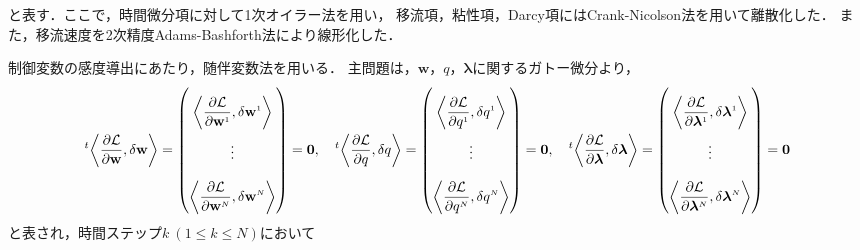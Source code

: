 と表す．ここで，時間微分項に対して1次オイラー法を用い，
移流項，粘性項，Darcy項にはCrank-Nicolson法を用いて離散化した．
また，移流速度を2次精度Adams-Bashforth法により線形化した．\par
制御変数の感度導出にあたり，随伴変数法を用いる．
主問題は，$\mathbf{w}$，$q$，$\boldsymbol{\lambda}$に関するガトー微分より，
\begin{equation}
    \everymath{\displaystyle}
    \setlength{\arraycolsep}{0.5pt}
    \renewcommand{\arraystretch}{2.5}
    \label{eq:main_problem}
    {}^{t}\!\left\langle\frac{\partial \mathcal{L}}{\partial \mathbf{w}}, \delta {\mathbf{w}}\right\rangle
    = \begin{pmatrix}
        \left\langle\frac{\partial \mathcal{L}}{\partial \mathbf{w}^{\scriptscriptstyle 1}}, \delta {\mathbf{w}}^{\scriptscriptstyle 1}\right\rangle \\
        \vdots \\
        \left\langle\frac{\partial \mathcal{L}}{\partial \mathbf{w}^{\scriptscriptstyle N}}, \delta {\mathbf{w}}^{\scriptscriptstyle N}\right\rangle 
    \end{pmatrix}
    =\mathbf{0}
    ,\quad
    {}^{t}\!\left\langle\frac{\partial \mathcal{L}}{\partial q}, \delta {q}\right\rangle
    = \begin{pmatrix}
        \left\langle\frac{\partial \mathcal{L}}{\partial q^{\scriptscriptstyle 1}}, \delta {q}^{\scriptscriptstyle 1}\right\rangle \\
        \vdots \\
        \left\langle\frac{\partial \mathcal{L}}{\partial q^{\scriptscriptstyle N}}, \delta {q}^{\scriptscriptstyle N}\right\rangle 
    \end{pmatrix}
    =\mathbf{0}
    ,\quad
    {}^{t}\!\left\langle\frac{\partial \mathcal{L}}{\partial \boldsymbol{\lambda}}, \delta \boldsymbol{\lambda}\right\rangle
    = \begin{pmatrix}
        \left\langle\frac{\partial \mathcal{L}}{\partial \boldsymbol{\lambda}^{\scriptscriptstyle 1}}, \delta \boldsymbol{\lambda}^{\scriptscriptstyle 1}\right\rangle \\
        \vdots \\
        \left\langle\frac{\partial \mathcal{L}}{\partial \boldsymbol{\lambda}^{\scriptscriptstyle N}}, \delta \boldsymbol{\lambda}^{\scriptscriptstyle N}\right\rangle 
    \end{pmatrix}
    =\mathbf{0}
\end{equation}
と表され，時間ステップ$k \ (1 \leq k \leq N)$において
